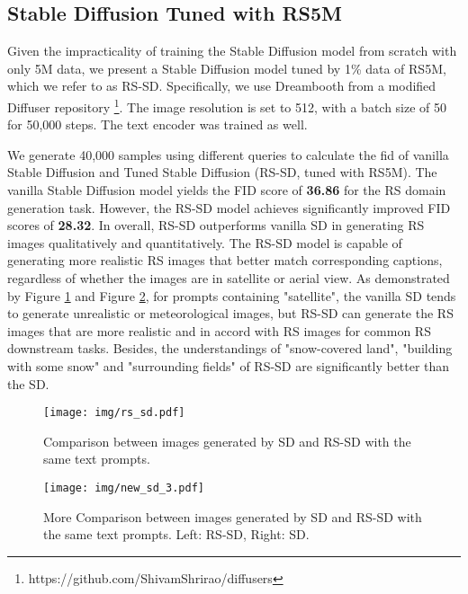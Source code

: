 \documentclass[journal]{IEEEtran}
\begin{document}
\subsection{Stable Diffusion Tuned with RS5M}
\label{appendix:sd}

Given the impracticality of training the Stable Diffusion model from scratch with only 5M data, we present a Stable Diffusion model tuned by 1\% data of RS5M, which we refer to as RS-SD. Specifically, we use Dreambooth \cite{dreambooth} from a modified Diffuser repository \cite{diffusers}\footnote{https://github.com/ShivamShrirao/diffusers}. The image resolution is set to 512, with a batch size of 50 for 50,000 steps. The text encoder was trained as well. 

We generate 40,000 samples using different queries to calculate the fid of vanilla Stable Diffusion and Tuned Stable Diffusion (RS-SD, tuned with RS5M). The vanilla Stable Diffusion model yields the FID score of \textbf{36.86} for the RS domain generation task. However, the RS-SD model achieves significantly improved FID scores of \textbf{28.32}. In overall, RS-SD outperforms vanilla SD in generating RS images qualitatively and quantitatively. The RS-SD model is capable of generating more realistic RS images that better match corresponding captions, regardless of whether the images are in satellite or aerial view.  As demonstrated by Figure \ref{fig:stable_diffusion_demo} and Figure \ref{fig:stable_diffusion_demo_2}, for prompts containing "satellite", the vanilla SD tends to generate unrealistic or meteorological images, but RS-SD can generate the RS images that are more realistic and in accord with RS images for common RS downstream tasks. Besides, the understandings of "snow-covered land", "building with some snow" and "surrounding fields" of RS-SD are significantly better than the SD. 


\begin{figure}[htbp]
    \centering
    \texttt{[image: img/rs\_sd.pdf]}
    \caption{Comparison between images generated by SD and RS-SD with the same text prompts.}
    \label{fig:stable_diffusion_demo}
\end{figure}


\begin{figure}[htbp]
    \centering
    \texttt{[image: img/new\_sd\_3.pdf]}
    \caption{More Comparison between images generated by SD and RS-SD with the same text prompts. Left: RS-SD, Right: SD.}
    \label{fig:stable_diffusion_demo_2}
\end{figure}
\end{document}
